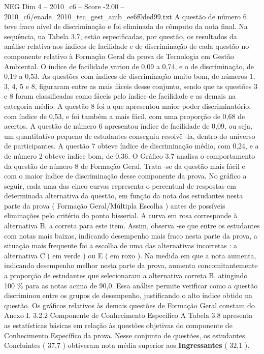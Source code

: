 \begin{textsample}{NEG Dim 4 – 2010\_c6 – Score -2.00 – 2010\_c6/enade\_2010\_tec\_gest\_amb\_ee6f0ded99.txt}
A questão de número 6 teve fraco nível de discriminação e foi eliminada do cômputo da nota final.
Na sequência, na Tabela 3.7, estão especificadas, por questão, os resultados da análise relativa aos índices de facilidade e de discriminação de cada questão no componente relativo à Formação Geral da prova de Tecnologia em Gestão Ambiental.
O índice de facilidade variou de 0,09 a 0,74, e o de discriminação, de 0,19 a 0,53.
As questões com índices de discriminação muito bom, de números 1, 3, 4, 5 e 8, figuraram entre as mais fáceis desse conjunto, sendo que as questões 3 e 8 foram classificadas como fáceis pelo índice de facilidade e as demais na categoria médio.
A questão 8 foi a que apresentou maior poder discriminatório, com índice de 0,53, e foi também a mais fácil, com uma proporção de 0,68 de acertos.
A questão de número 6 apresentou índice de facilidade de 0,09, ou seja, um quantitativo pequeno de estudantes conseguiu resolvê -la, dentro do universo de participantes.
A questão 7 obteve índice de discriminação médio, com 0,24, e a de número 2 obteve índice bom, de 0,36.
O Gráfico 3.7 analisa o comportamento da questão de número 8 de Formação Geral.
Trata -se da questão mais fácil e com o maior índice de discriminação desse componente da prova.
No gráfico a seguir, cada uma das cinco curvas representa o percentual de respostas em determinada alternativa da questão, em função da nota dos estudantes nesta parte da prova ( Formação Geral/Múltipla Escolha ) antes de possíveis eliminações pelo critério do ponto bisserial.
A curva em rosa corresponde à alternativa B, a correta para este item.
Assim, observa -se que entre os estudantes com notas mais baixas, indicando desempenho mais fraco nesta parte da prova, a situação mais frequente foi a escolha de uma das alternativas incorretas : a alternativa C ( em verde ) ou E ( em roxo ).
Na medida em que a nota aumenta, indicando desempenho melhor nesta parte da prova, aumenta concomitantemente a proporção de estudantes que selecionaram a alternativa correta B, atingindo 100 \% para as notas acima de 90,0.
Essa análise permite verificar como a questão discriminou entre os grupos de desempenho, justificando o alto índice obtido na questão.
Os gráficos relativos às demais questões de Formação Geral constam do Anexo I. 3.2.2 Componente de Conhecimento Específico A Tabela 3.8 apresenta as estatísticas básicas em relação às questões objetivas do componente de Conhecimento Específico da prova.
Nesse conjunto de questões, os estudantes Concluintes ( 37,7 ) obtiveram nota média superior aos \textbf{Ingressantes} ( 32,1 ).

\end{textsample}
